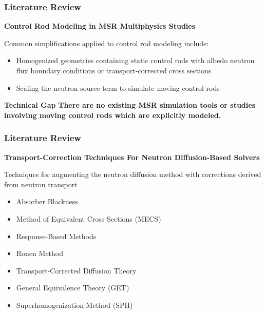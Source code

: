 \begin{frame}
  \frametitle{Literature Review}
  \textbf{Control Rod Modeling in MSR Multiphysics Studies}

  Common simplifications applied to control rod modeling include:
  \begin{itemize}
    \item Homogenized geometries containing static control rods with albedo neutron flux boundary
      conditions \cite{kophazi_development_2009} or transport-corrected cross sections
      \cite{cui_development_2021, jaradat_development_2021, yang_development_2022}
    \item Scaling the neutron source term to simulate moving control rods
      \cite{delpech_benchmark_2003, krepel_dyn3d-msr_2007, jaradat_development_2021,
      yang_development_2022}
  \end{itemize}

  \begin{block}{\textbf{Technical Gap}}
    \textbf{There are no existing MSR simulation tools or studies involving moving control rods
    which are explicitly modeled.}
  \end{block}
\end{frame}

\begin{frame}
  \frametitle{Literature Review}
  \textbf{Transport-Correction Techniques For Neutron Diffusion-Based Solvers}
  \vspace{.3cm}

  Techniques for augmenting the neutron diffusion method with corrections derived from neutron
  transport
  \begin{itemize}
    \item Absorber Blackness
    \item Method of Equivalent Cross Sections (MECS)
    \item Response-Based Methods
    \item Ronen Method
    \item Transport-Corrected Diffusion Theory
    \item General Equivalence Theory (GET)
    \item Superhomogenization Method (SPH)
  \end{itemize}
\end{frame}

